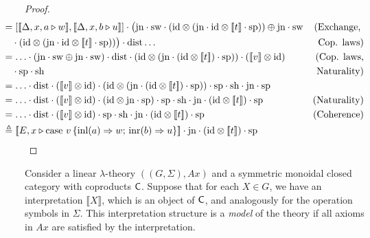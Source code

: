\begin{proof}
\begin{align*}
  & \hspace{-30pt} = [[\![ \Delta  , x ,  a \vljud w]\!] , [\![ \Delta  , x ,  b \vljud u]\!]]  \comp \big(\text{jn} \comp \sw \comp (\id \otimes  (\text{jn} \comp \id \otimes [\![t]\!]  \comp \text{sp}))  \oplus \text{jn} \comp  \sw      & {(\text{Exchange, }}  \\
  & \hspace{-30pt} \hspace{10pt} \comp (\id \otimes  (\text{jn} \comp \id \otimes [\![t]\!] \comp \text{sp}) )\big) \comp \dist \ldots  & { \text{Cop. laws})}\\
  & \hspace{-30pt} = \ldots \comp  (\text{jn} \comp \sw \oplus \text{jn} \comp \sw)  \comp \dist \comp ( \id \otimes (\text{jn} \cdot (\id \otimes [\![t]\!]) \cdot \text{sp} ) ) \comp ([\![v]\!] \otimes \id)  & {(\text{Cop. laws,}}  \\
  & \hspace{-20pt} \comp \text{sp} \comp \text{sh} & {\text{Naturality})} \\
  & \hspace{-30pt} =  \ldots \comp \dist \comp  ([\![v]\!] \otimes \id)  \comp ( \id \otimes (\text{jn} \comp  (\id \otimes [\![t]\!]) \cdot \text{sp} ) ) \comp \text{sp}\comp \text{sh} \comp \text{jn}  \comp \text{sp}    & \\
  & \hspace{-30pt} = \ldots \comp \dist \comp  ([\![v]\!] \otimes \id)  \comp ( \id \otimes \text{jn} \comp \text{sp}) \comp \text{sp}  \comp \text{sh}    \comp \text{jn} \comp (\id \otimes [\![ t ]\!] ) \comp \text{sp} & {(\text{Naturality})}   \\
  & \hspace{-30pt} =  \ldots  \comp \dist   \comp ([\![v  ]\!] \otimes \id) \comp \text{sp} \comp \text{sh} \comp \text{jn} \comp (\id \otimes [\![ t ]\!] ) \comp \text{sp}  & {(\text{Coherence})}     \\ 
  & \hspace{-30pt} \triangleq  [\![E,  x\vljud \text{case } v\,  \{\text{inl} (a) \Rightarrow w ;\, \text{inr} (b) \Rightarrow u\}]\!] \comp \text{jn} \comp (\id \otimes [\![ t ]\!] ) \comp \text{sp}
\end{align*}




\end{proof}

\begin{definition} 
Consider a linear \(\lambda\)-theory \(((G, \Sigma), Ax)\) and a symmetric monoidal closed category with coproducts \(\mathsf{C}\). 
Suppose that for each \(X \in G\), we have an interpretation \(\llbracket X \rrbracket\), which is an object of \(\mathsf{C}\), 
and analogously for the operation symbols in \(\Sigma\). 
This interpretation structure is a \emph{model} of the theory if all axioms in \(Ax\) are satisfied by the interpretation.
\end{definition}




